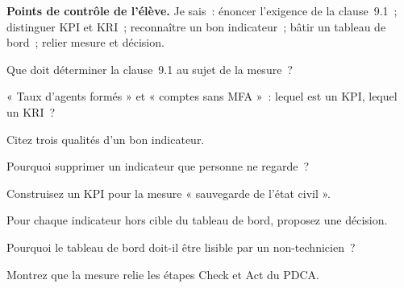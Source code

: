 \begin{boxinfo}
\textbf{Points de contrôle de l'élève.} Je sais~: énoncer l'exigence de la
clause~9.1~; distinguer KPI et KRI~; reconnaître un bon indicateur~; bâtir un
tableau de bord~; relier mesure et décision.
\end{boxinfo}

\bigskip

\begin{boxexo}[title={\ding{45}\quad Exercice~18.1. Quoi mesurer \niveaubase}]
Que doit déterminer la clause~9.1 au sujet de la mesure~?
\end{boxexo}

\begin{boxexo}[title={\ding{45}\quad Exercice~18.2. KPI ou KRI \niveaubase}]
« Taux d'agents formés » et « comptes sans MFA »~: lequel est un KPI, lequel un
KRI~?
\end{boxexo}

\begin{boxexo}[title={\ding{45}\quad Exercice~18.3. Bon indicateur \niveaubase}]
Citez trois qualités d'un bon indicateur.
\end{boxexo}

\begin{boxexo}[title={\ding{45}\quad Exercice~18.4. Indicateur inutile \niveaumoyen}]
Pourquoi supprimer un indicateur que personne ne regarde~?
\end{boxexo}

\begin{boxexo}[title={\ding{45}\quad Exercice~18.5. Construire un KPI \niveaumoyen}]
Construisez un KPI pour la mesure « sauvegarde de l'état civil ».
\end{boxexo}

\begin{boxexo}[title={\ding{45}\quad Exercice~18.6. Hors cible \niveaumoyen}]
Pour chaque indicateur hors cible du tableau de bord, proposez une décision.
\end{boxexo}

\begin{boxexo}[title={\ding{45}\quad Exercice~18.7. Lisible \niveaumoyen}]
Pourquoi le tableau de bord doit-il être lisible par un non-technicien~?
\end{boxexo}

\begin{boxexo}[title={\ding{45}\quad Exercice~18.8. Check et Act \niveaumoyen}]
Montrez que la mesure relie les étapes Check et Act du PDCA.
\end{boxexo}

